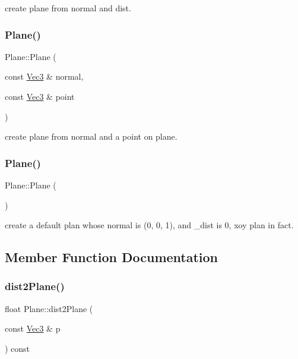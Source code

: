 create plane from normal and dist. \mbox{\label{classPlane_ae7c0502b316e1b7b6cd3952681cf125d}} 
\subsubsection{\texorpdfstring{Plane()}{Plane()}\hspace{0.1cm}{\footnotesize\ttfamily [7/8]}}
{\footnotesize\ttfamily Plane\+::\+Plane (\begin{DoxyParamCaption}\item[{const \hyperlink{classVec3}{Vec3} \&}]{normal,  }\item[{const \hyperlink{classVec3}{Vec3} \&}]{point }\end{DoxyParamCaption})}

create plane from normal and a point on plane. \mbox{\label{classPlane_acac0d9c003e0ab10d07b146c3566a0c7}} 
\subsubsection{\texorpdfstring{Plane()}{Plane()}\hspace{0.1cm}{\footnotesize\ttfamily [8/8]}}
{\footnotesize\ttfamily Plane\+::\+Plane (\begin{DoxyParamCaption}{ }\end{DoxyParamCaption})}

create a default plan whose normal is (0, 0, 1), and \+\_\+dist is 0, xoy plan in fact. 

\subsection{Member Function Documentation}
\mbox{\label{classPlane_a7e5bcf2d7ae8efe45753d782944a618a}} 
\subsubsection{\texorpdfstring{dist2\+Plane()}{dist2Plane()}\hspace{0.1cm}{\footnotesize\ttfamily [1/2]}}
{\footnotesize\ttfamily float Plane\+::dist2\+Plane (\begin{DoxyParamCaption}\item[{const \hyperlink{classVec3}{Vec3} \&}]{p }\end{DoxyParamCaption}) const}

